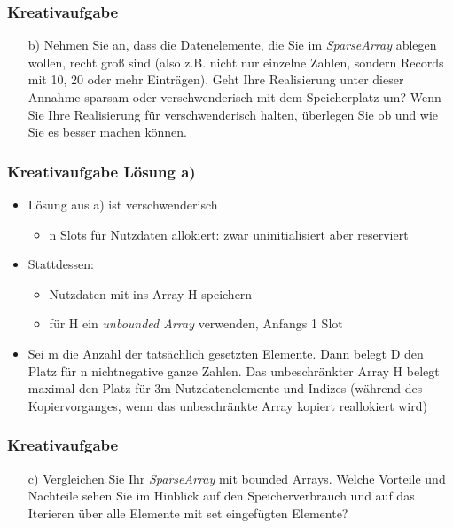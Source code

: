 \begin{frame}
	\frametitle{Kreativaufgabe}

	\begin{itemize}
		\item[b)] Nehmen Sie an, dass die Datenelemente, die Sie im \textit{SparseArray} ablegen wollen, recht groß sind (also z.B. nicht nur einzelne Zahlen, sondern Records mit 10, 20 oder mehr Einträgen).
			Geht Ihre Realisierung unter dieser Annahme sparsam oder verschwenderisch mit dem Speicherplatz um? Wenn Sie Ihre Realisierung für verschwenderisch halten, überlegen Sie
			ob und wie Sie es besser machen können.
	\end{itemize}

\end{frame}
\begin{frame}
	\frametitle{Kreativaufgabe Lösung a)}
	\begin{itemize}
		\item Lösung aus a) ist verschwenderisch
		\begin{itemize}
			\item n Slots für Nutzdaten allokiert: zwar uninitialisiert aber reserviert
		\end{itemize} 
		\item Stattdessen:
		\begin{itemize}
			\item Nutzdaten mit ins Array H speichern 
			\item für H ein \textit{unbounded Array} verwenden, Anfangs 1 Slot
		\end{itemize}
		\item Sei m die Anzahl der tatsächlich gesetzten Elemente. Dann belegt D den Platz für 
		n nichtnegative ganze Zahlen. Das unbeschränkter Array H belegt maximal den Platz für 3m
		Nutzdatenelemente und Indizes (während des Kopiervorganges, wenn das unbeschränkte
		Array kopiert reallokiert wird)
	\end{itemize}
\end{frame}

\begin{frame}
	\frametitle{Kreativaufgabe}

	\begin{itemize}
		\item[c)] Vergleichen Sie Ihr \textit{SparseArray} mit bounded Arrays. Welche Vorteile und Nachteile sehen
			Sie im Hinblick auf den Speicherverbrauch und auf das Iterieren über alle Elemente mit set eingefügten Elemente?
	\end{itemize}

\end{frame}

